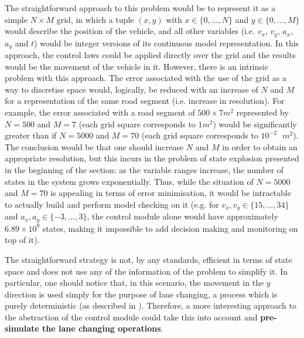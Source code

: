 The straightforward approach to this problem would be to represent it as a simple $N\times M$ grid, in which a tuple $(x,y)$ with $x\in \{0,...,N\}$ and $y\in \{0,...,M\}$ would describe the position of the vehicle, and all other variables (i.e. $v_x$, $v_y$, $a_x$, $a_y$ and $t$) would be integer versions of its continuous model representation. In this approach, the control laws could be applied directly over the grid and the results would be the movement of the vehicle in it. However, there is an intrinsic problem with this approach. The error associated with the use of the grid as a way to discretise space would, logically, be reduced with an increase of $N$ and $M$ for a representation of the same road segment (i.e. increase in resolution). For example, the error associated with a road segment of $500 \times 7m^2$ represented by $N = 500$ and $M = 7$ (each grid square corresponds to $1m^2$) would be significantly greater than if $N = 5000$ and $M = 70$ (each grid square corresponds to  $10^{-2}\text{ }m^2$). The conclusion would be that one should increase $N$ and $M$ in order to obtain an appropriate resolution, but this incurs in the problem of state explosion presented in the beginning of the section: as the variable ranges increase, the number of states in the system grows exponentially. Thus, while the situation of $N = 5000$ and $M = 70$ is appealing in terms of error minimisation, it would be intractable to actually build and perform model checking on it (e.g. for $v_x, v_y \in \{15,...,34\}$ and $a_x, a_y \in \{-3,...,3\}$, the control module alone would have approximately $6.89\times 10^{9}$ states, making it impossible to add decision making and monitoring on top of it). 

The straightforward strategy is not, by any standards, efficient in terms of state space and does not use any of the information of the problem to simplify it. In particular, one should notice that, in this scenario, the movement in the $y$ direction is used simply for the purpose of lane changing, a process which is purely deterministic (as described in \cite{salvucci_1}). Therefore, a more interesting approach to the abstraction of the control module could take this into account and \textbf{pre-simulate the lane changing operations}.

